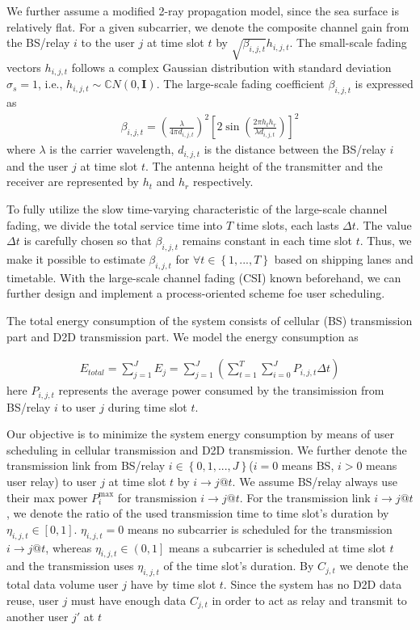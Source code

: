 \documentclass{ieeeaccess}
\begin{document}
We further assume a modified 2-ray propagation model, since the sea surface is relatively flat. For a given subcarrier, we denote the composite channel gain from the BS/relay $i$ to the user $j$ at time slot $t$ by $\sqrt {{\beta _{i,j,t}}} {h_{i,j,t}}$. The small-scale fading vectors ${h_{i,j,t}}$ follows a complex Gaussian distribution with standard deviation ${\sigma _s} = 1$, i.e., ${h_{i,j,t}} \sim \mathbb{C}N\left( {0,{\mathbf{I}}} \right)$. The large-scale fading coefficient ${\beta _{i,j,t}}$ is expressed as
\begin{align}
{\beta _{i,j,t}} = {\left( {\frac{\lambda }{{4\pi {d_{i,j,t}}}}} \right)^2}{\left[ {2\sin \left( {\frac{{2\pi {h_t}{h_r}}}{{\lambda {d_{i,j,t}}}}} \right)} \right]^2}
\end{align}
where $\lambda $ is the carrier wavelength, ${d_{i,j,t}}$ is the distance between the BS/relay $i$ and the user $j$ at time slot $t$. The antenna height of the transmitter and the receiver are represented by $h_t$ and $h_r$ respectively.


To fully utilize the slow time-varying characteristic of the large-scale channel fading, we divide the total service time into $T$ time slots, each lasts $\Delta t$. The value $\Delta t$ is carefully chosen so that $\beta _{i,j,t}$ remains constant in each time slot $t$. Thus, we make it possible to estimate $\beta _{i,j,t}$ for $\forall t \in \left\{ {1,...,T} \right\}$ based on shipping lanes and timetable. With the large-scale channel fading (CSI) known beforehand, we can further design and implement a process-oriented scheme foe user scheduling.

The total energy consumption of the system consists of cellular (BS) transmission part and D2D transmission part. We model the energy consumption as

\begin{align}
{{E_{total}} = \sum\limits_{j = 1}^J {{E_j}}  = \sum\limits_{j = 1}^J {\left( {\sum\limits_{t = 1}^T {\sum\limits_{i = 0}^J {{P_{i,j,t}}\Delta t} } } \right)} }
\end{align}
here ${P_{i,j,t}}$ represents the average power consumed by the transimission from BS/relay $i$ to user $j$ during time slot $t$.

Our objective is to minimize the system energy consumption by means of user scheduling in cellular transmission and D2D transmission. We further denote the transmission link from BS/relay $i \in \left\{ {0,1,...,J} \right\}$($i = 0$ means BS, $i > 0$ means user relay) to user $j$ at time slot $t$ by $i \to j@t$. We assume BS/relay always use their max power $P_i^{\max }$ for transmission $i \to j@t$. For the transmission link $i \to j@t$, we denote the ratio of the used transmission time to time slot's duration by ${\eta _{i,j,t}} \in [0,1]$. ${\eta _{i,j,t}} = 0$ means no subcarrier is scheduled for the transmission $i \to j@t$, whereas ${\eta _{i,j,t}} \in \left( {0,1} \right]$ means a subcarrier is scheduled at time slot $t$ and the transmission uses ${\eta _{i,j,t}}$ of the time slot's duration. By ${C_{j,t}}$ we denote the total data volume user $j$ have by time slot $t$. Since the system has no D2D data reuse, user $j$ must have enough data ${C_{j,t}}$ in order to act as relay and transmit to another user $j'$ at $t$
\end{document}
